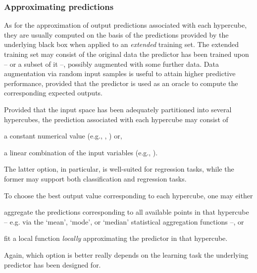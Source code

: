 \documentclass[
]{ceurart}
\begin{document}
\subsubsection{Approximating predictions}

As for the approximation of output predictions associated with each hypercube, they are usually computed on the basis of the predictions provided by the underlying black box when applied to an \emph{extended} training set.
%
The extended training set may consist of the original data the predictor has been trained upon -- or a subset of it --, possibly augmented with some further data.
%
Data augmentation via random input samples is useful to attain higher predictive performance, provided that the predictor is used as an oracle to compute the corresponding expected outputs.

Provided that the input space has been adequately partitioned into several hypercubes, the prediction associated with each hypercube may consist of 
%
\begin{inlinelist}
	\item a constant numerical value (e.g., \iter{}, \gridex{}) or, 
	\item a linear combination of the input variables (e.g., \gridrex{}).
\end{inlinelist}
%
The latter option, in particular, is well-suited for regression tasks, while the former may support both classification and regression tasks.

To choose the best output value corresponding to each hypercube, one may either 
%
\begin{inlinelist}
	\item aggregate the predictions corresponding to all available points in that hypercube -- e.g. via the `mean', `mode', or `median' statistical aggregation functions --, or
	\item fit a local function \emph{locally} approximating the predictor in that hypercube.
\end{inlinelist}
%
Again, which option is better really depends on the learning task the underlying predictor has been designed for.
%
\end{document}
